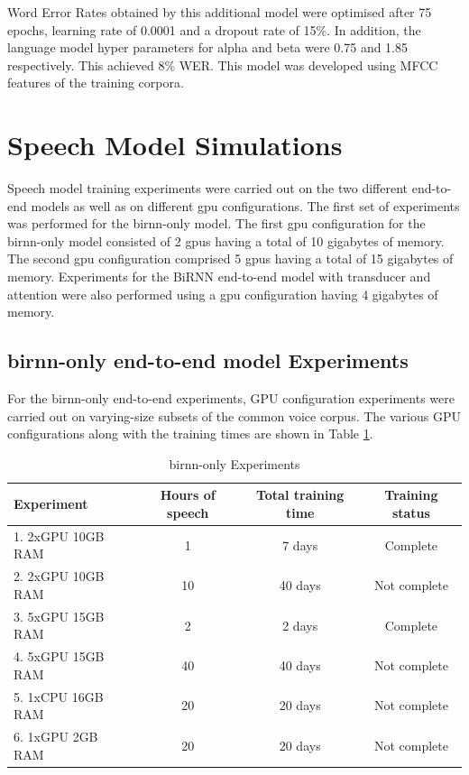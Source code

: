 Word Error Rates obtained by this additional model were optimised after 75 epochs, learning rate of 0.0001 and a dropout rate of 15\%.  In addition, the language model hyper parameters for alpha and beta were 0.75 and 1.85 respectively.  This achieved 8\% WER. This model was developed using MFCC features of the training corpora.

\section{Speech Model Simulations}

Speech model training experiments were carried out on the two different end-to-end models as well as on different \acrshort{gpu} configurations. The first set of experiments was performed for the \acrshort{birnn}-only model.  The first \acrshort{gpu} configuration for the \acrshort{birnn}-only model consisted of 2 \acrshort{gpu}s having a total of 10 gigabytes of memory. The second \acrshort{gpu} configuration comprised 5 \acrshort{gpu}s having a total of 15 gigabytes of memory. Experiments for the BiRNN end-to-end model with transducer and attention were also performed using a \acrshort{gpu} configuration having 4 gigabytes of memory. 

\subsection{\acrshort{birnn}-only end-to-end model Experiments}
For the \acrshort{birnn}-only end-to-end experiments, GPU configuration experiments were carried out on varying-size subsets of the common voice corpus.   The various GPU configurations along with the training times are shown in Table \ref{tab_c6_01_training}.

\begin{table}
  \caption{\acrshort{birnn}-only Experiments}
  \label{tab_c6_01_training}
\begin{tabular}{lccc}
\toprule
Experiment & Hours of speech & Total training time & Training status\\
\midrule
1. 2xGPU 10GB RAM & 1 & 7 days & Complete\\
2. 2xGPU 10GB RAM & 10 & 40 days & Not complete\\
3. 5xGPU 15GB RAM & 2 & 2 days & Complete\\
4. 5xGPU 15GB RAM & 40 & 40 days & Not complete\\
5. 1xCPU 16GB RAM & 20 & 20 days & Not complete\\
6. 1xGPU 2GB RAM & 20 & 20 days & Not complete\\
\bottomrule
\end{tabular}
\end{table}

